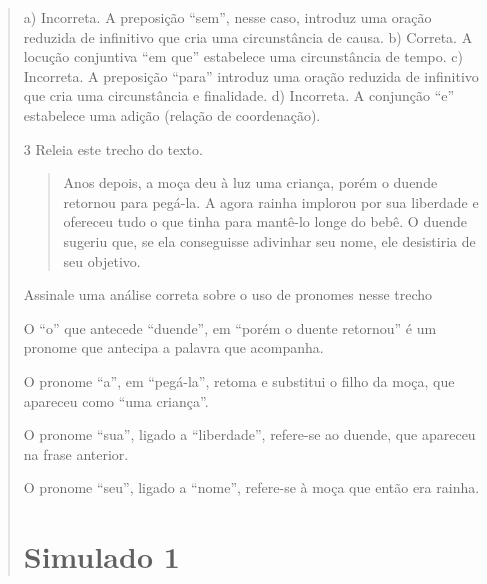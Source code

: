 \begin{quote}
{a) Incorreta. A preposição ``sem'', nesse caso, introduz uma oração reduzida de infinitivo que cria uma circunstância de causa.
b) Correta. A locução conjuntiva ``em que'' estabelece uma circunstância de tempo.
c) Incorreta. A preposição ``para'' introduz uma oração reduzida de infinitivo que cria uma circunstância e finalidade.
d) Incorreta. A conjunção ``e'' estabelece uma adição (relação de coordenação).}

\num{3} Releia este trecho do texto.

\begin{quote}
Anos depois, a moça deu à luz uma criança, porém o duende retornou para
pegá-la. A agora rainha implorou por sua liberdade e ofereceu tudo o que
tinha para mantê-lo longe do bebê. O duende sugeriu que, se ela
conseguisse adivinhar seu nome, ele desistiria de seu objetivo.
\end{quote}

Assinale uma análise correta sobre o uso de pronomes nesse trecho

\begin{escolha}
\item O ``o'' que antecede ``duende'', em ``porém o duente retornou'' é um pronome que antecipa a palavra que acompanha.

\item O pronome ``a'', em ``pegá-la'', retoma e substitui o filho da moça, que apareceu como ``uma criança''.

\item O pronome ``sua'', ligado a ``liberdade'', refere-se ao duende, que apareceu na frase anterior.

\item O pronome ``seu'', ligado a ``nome'', refere-se à moça que então era rainha.
\end{escolha}


\chapter{Simulado 1}


\end{quote}
